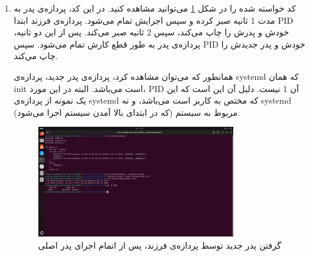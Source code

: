 \documentclass[12pt]{article}
\begin{document}
\begin{enumerate}
        \item 
        کد خواسته شده را در شکل
        \ref{im11}
        می‌توانید مشاهده کنید. در این کد، پردازه‌ی پدر به مدت 
        \textenglish{1}
        ثانیه صبر کرده و سپس اجرایش تمام می‌شود. پردازه‌ی فرزند ابتدا 
        \textenglish{PID}
        خودش و پدرش را چاپ می‌کند، سپس 
        \textenglish{2}
        ثانیه صبر می‌کند. پس از این دو ثانیه، پردازه‌ی پدر به طور قطع کارش تمام می‌شود. سپس
        \textenglish{PID}
        خودش و پدر جدیدش را چاپ می‌کند. 

        همانطور که می‌توان مشاهده کرد، پردازه‌ی پدر جدید، پردازه‌ی
        \textenglish{systemd}
        که همان 
        \textenglish{init}
        است می‌باشد. البته در این مورد، 
        \textenglish{PID}
        آن 
        \textenglish{1}
        نیست. دلیل آن این است که این یک نمونه از پردازه‌ی
        \textenglish{systemd}
        که مختص به کاربر است می‌باشد، و نه 
        \textenglish{systemd}
        مربوط به سیستم (که در ابتدای بالا آمدن سیستم اجرا می‌شود).

        \begin{figure}[H]
		\centering
		\includegraphics[width=0.8\textwidth]{report4-resources/11.png}
		\caption{گرفتن پدر جدید توسط پردازه‌ی فرزند، پس از اتمام اجرای پدر اصلی}
            \label{im11}
	\end{figure}
        \end{enumerate}
\end{document}
